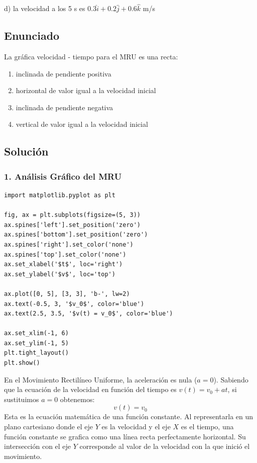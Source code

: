 \documentclass[12pt, a4paper]{article}
\begin{document}
\begin{tcolorbox}[colback=green!5!white, colframe=green!50!black, title=Respuesta Final]
\centering \Large d) la velocidad a los 5 s es $0.3\hat{i} + 0.2\hat{j} + 0.6\hat{k}$ m/s
\end{tcolorbox}

\newpage

\subsection*{Enunciado}
La gráfica velocidad - tiempo para el MRU es una recta:
\begin{enumerate}[label=\alph*)]
    \item inclinada de pendiente positiva
    \item horizontal de valor igual a la velocidad inicial
    \item inclinada de pendiente negativa
    \item vertical de valor igual a la velocidad inicial
\end{enumerate}


\subsection*{Solución}

\subsubsection*{1. Análisis Gráfico del MRU}

\begin{lstlisting}
import matplotlib.pyplot as plt

fig, ax = plt.subplots(figsize=(5, 3))
ax.spines['left'].set_position('zero')
ax.spines['bottom'].set_position('zero')
ax.spines['right'].set_color('none')
ax.spines['top'].set_color('none')
ax.set_xlabel('$t$', loc='right')
ax.set_ylabel('$v$', loc='top')

ax.plot([0, 5], [3, 3], 'b-', lw=2)
ax.text(-0.5, 3, '$v_0$', color='blue')
ax.text(2.5, 3.5, '$v(t) = v_0$', color='blue')

ax.set_xlim(-1, 6)
ax.set_ylim(-1, 5)
plt.tight_layout()
plt.show()
\end{lstlisting}

En el Movimiento Rectilíneo Uniforme, la aceleración es nula ($a = 0$). 
Sabiendo que la ecuación de la velocidad en función del tiempo es $v(t) = v_0 + at$, si sustituimos $a=0$ obtenemos:
$$ v(t) = v_0 $$
Esta es la ecuación matemática de una función constante. Al representarla en un plano cartesiano donde el eje $Y$ es la velocidad y el eje $X$ es el tiempo, una función constante se grafica como una línea recta perfectamente horizontal. Su intersección con el eje $Y$ corresponde al valor de la velocidad con la que inició el movimiento.
\end{document}

